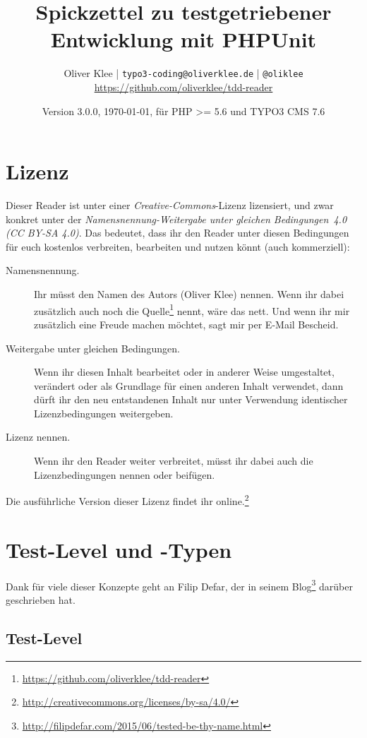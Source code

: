 \documentclass[a4paper,10pt,headsepline]{scrartcl}
\author{
  Oliver Klee | \texttt{typo3-coding@oliverklee.de} | \texttt{@oliklee} \\
  \url{https://github.com/oliverklee/tdd-reader}
}
\date{Version 3.0.0, \today, für PHP >= 5.6 und TYPO3 CMS 7.6}
\title{
  Spickzettel zu testgetriebener Entwicklung mit PHPUnit
}
\begin{document}
\maketitle

\section*{Lizenz}

Dieser Reader ist unter einer \emph{Creative-Commons}-Lizenz lizensiert, und zwar konkret unter der \emph{Namensnennung-Weitergabe unter gleichen Bedingungen~4.0 (CC BY-SA 4.0)}. Das bedeutet, dass ihr den Reader unter diesen Bedingungen für euch kostenlos verbreiten, bearbeiten und nutzen könnt (auch kommerziell):

\begin{description}
  \item[Namensnennung.] Ihr müsst den Namen des Autors (Oliver Klee) nennen. Wenn ihr dabei zusätzlich auch noch die Quelle\footnote{\url{https://github.com/oliverklee/tdd-reader}} nennt, wäre das nett. Und wenn ihr mir zusätzlich eine Freude machen möchtet, sagt mir per E-Mail Bescheid.
  \item[Weitergabe unter gleichen Bedingungen.] Wenn ihr diesen Inhalt bearbeitet oder in anderer Weise umgestaltet, verändert oder als Grundlage für einen anderen Inhalt verwendet, dann dürft ihr den neu entstandenen Inhalt nur unter Verwendung identischer Lizenzbedingungen weitergeben.
  \item[Lizenz nennen.] Wenn ihr den Reader weiter verbreitet, müsst ihr dabei auch die Lizenzbedingungen nennen oder beifügen.
\end{description}

Die ausführliche Version dieser Lizenz findet ihr online.\footnote{\url{http://creativecommons.org/licenses/by-sa/4.0/}}


\pagebreak
\tableofcontents

\pagebreak
\section{Test-Level und -Typen}

Dank für viele dieser Konzepte geht an Filip Defar, der in seinem Blog\footnote{\url{http://filipdefar.com/2015/06/tested-be-thy-name.html}} darüber geschrieben hat.


\subsection{Test-Level}
\end{document}
